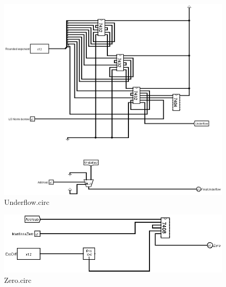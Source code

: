 \documentclass[18pt]{article}
\begin{document}
\begin{figure}[t]
    \centering
    \captionsetup{font=Large}
    \includegraphics[scale=0.5]{Util/Underflow.png}
    \caption{Underflow.circ}
\end{figure}
\begin{figure}[!h]
    \centering
    \captionsetup{font=Large}
    \includegraphics[scale=0.5]{Util/Zero.png}
    \caption{Zero.circ}
\end{figure}

\clearpage
\end{document}
